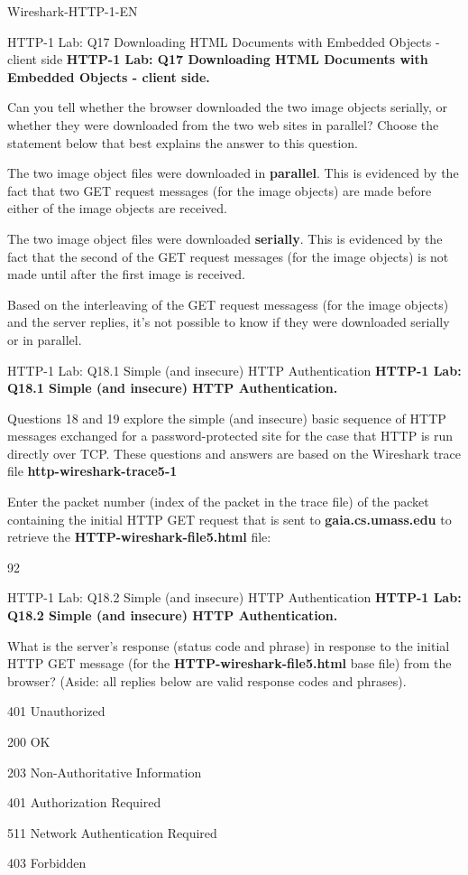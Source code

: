 \documentclass[a4paper]{article}
\begin{document}
\begin{quiz}{Wireshark-HTTP-1-EN}
\begin{multi}[points=1,shuffle]{HTTP-1 Lab: Q17 Downloading HTML Documents with Embedded Objects - client side}
\textbf{HTTP-1 Lab: Q17 Downloading HTML Documents with Embedded Objects - client side.} 

Can you tell whether the browser downloaded the two image objects serially, or whether they were downloaded from the two web sites in parallel? Choose the statement below that best explains the answer to this question.  
\item The two image object files were downloaded in \textbf{parallel}. This is evidenced by the fact that two GET request messages (for the image objects) are made before either of the image objects are received.
\item* The two image object files were downloaded \textbf{serially}. This is evidenced by the fact that the second of the GET request messages (for the image objects) is not made until after the first image is received. 
\item Based on the interleaving of the GET request messagess (for the image objects) and the server replies, it's not possible to know if they were downloaded serially or in parallel.
\end{multi}

\begin{shortanswer}[points=1]{HTTP-1 Lab: Q18.1 Simple (and insecure) HTTP Authentication}
\textbf{HTTP-1 Lab: Q18.1 Simple (and insecure) HTTP Authentication.}

Questions 18 and 19 explore the simple (and insecure) basic sequence of HTTP messages exchanged for a password-protected site for the case that HTTP is run directly over TCP. These questions and answers are based on the Wireshark trace file \textbf{http-wireshark-trace5-1}

Enter the packet number (index of the packet in the trace file) of the packet containing the initial HTTP GET request that is sent to \textbf{gaia.cs.umass.edu} to retrieve the \textbf{HTTP-wireshark-file5.html} file:
\item 92
\end{shortanswer}

\begin{multi}[points=1,shuffle]{HTTP-1 Lab: Q18.2 Simple (and insecure) HTTP Authentication}
\textbf{HTTP-1 Lab: Q18.2 Simple (and insecure) HTTP Authentication.}

What is the server's response (status code and phrase) in response to the initial HTTP GET message (for the \textbf{HTTP-wireshark-file5.html} base file) from the browser? (Aside: all replies below are valid response codes and phrases).   
\item* 401 Unauthorized
\item 200 OK
\item 203 Non-Authoritative Information
\item 401 Authorization Required
\item 511 Network Authentication Required
\item 403 Forbidden
\end{multi}


\end{quiz}
\end{document}
